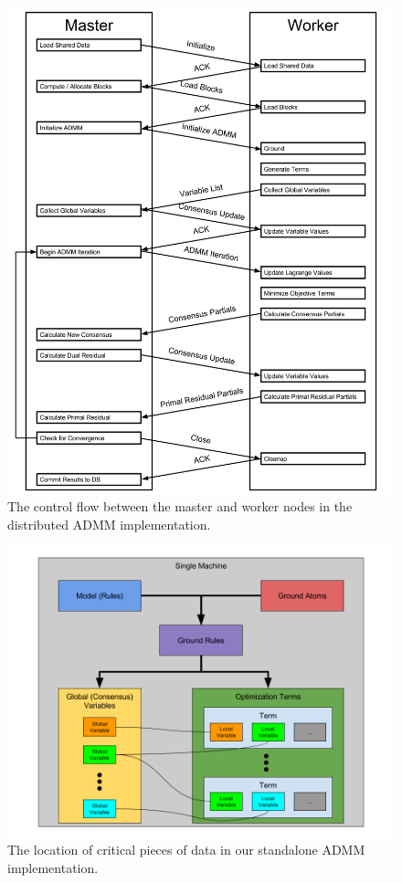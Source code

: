 \documentclass{article}
\begin{document}
    \begin{figure}[H]
        \centering
        \includegraphics[width=\textwidth]{images/Distributed_ADMM_Workflow.png}
        \caption{The control flow between the master and worker nodes in the distributed ADMM implementation.}
        \label{fig:distributed-admm-workflow}
    \end{figure}

    \begin{figure}[H]
        \centering
        \includegraphics[width=\textwidth]{images/ADMM_Single_Machine.png}
        \caption{The location of critical pieces of data in our standalone ADMM implementation.}
        \label{fig:standalone-admm-data}
    \end{figure}
\end{document}
